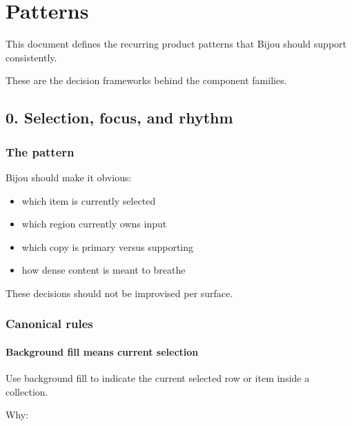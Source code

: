 \chapter{Patterns}\label{record-023}

\smallskip

This document defines the recurring product patterns that Bijou should support consistently.

These are the decision frameworks behind the component families.

\section{0. Selection, focus, and rhythm}\label{record-023-selection-focus-and-rhythm}

\subsection{The pattern}\label{record-023-the-pattern}

Bijou should make it obvious:

\begin{itemize}
\tightlist
\item
  which item is currently selected
\item
  which region currently owns input
\item
  which copy is primary versus supporting
\item
  how dense content is meant to breathe
\end{itemize}

These decisions should not be improvised per surface.

\subsection{Canonical rules}\label{record-023-canonical-rules}

\subsubsection{Background fill means current selection}\label{record-023-background-fill-means-current-selection}

Use background fill to indicate the current selected row or item inside a collection.

Why:

